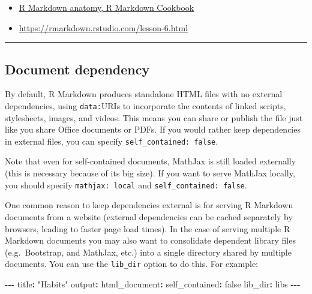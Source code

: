 \documentclass[
]{book}
\newenvironment{Shaded}{\begin{snugshade}}{\end{snugshade}}
\newcommand{\NormalTok}[1]{#1}
\newcommand{\SpecialCharTok}[1]{\textcolor[rgb]{0.81,0.36,0.00}{\textbf{#1}}}
\newcommand{\StringTok}[1]{\textcolor[rgb]{0.31,0.60,0.02}{#1}}
\providecommand{\tightlist}{%
  \setlength{\itemsep}{0pt}\setlength{\parskip}{0pt}}
\theoremstyle{definition}
\theoremstyle{definition}
\theoremstyle{definition}
\theoremstyle{definition}
\theoremstyle{remark}
\begin{document}
\begin{itemize}
\tightlist
\item
  \href{https://bookdown.org/yihui/rmarkdown-cookbook/rmarkdown-anatomy.html\#:~:text=In\%20short\%2C\%20we\%20can\%20include\%20variables\%20and\%20R\%20expressions\%20in\%20this\%20header\%20that\%20can\%20be\%20referenced\%20throughout\%20our\%20R\%20Markdown\%20document.}{R Markdown anatomy, R Markdown Cookbook}
\item
  \url{https://rmarkdown.rstudio.com/lesson-6.html}
\end{itemize}

\begin{center}\rule{0.5\linewidth}{0.5pt}\end{center}

\subsection*{Document dependency}\label{document-dependency}

By default, R Markdown produces standalone HTML files with no external dependencies, using \texttt{data:}URIs to incorporate the contents of linked scripts, stylesheets, images, and videos. This means you can share or publish the file just like you share Office documents or PDFs. If you would rather keep dependencies in external files, you can specify \texttt{self\_contained:\ false}.

Note that even for self-contained documents, MathJax is still loaded externally (this is necessary because of its big size). If you want to serve MathJax locally, you should specify \texttt{mathjax:\ local} and \texttt{self\_contained:\ false}.

One common reason to keep dependencies external is for serving R Markdown documents from a website (external dependencies can be cached separately by browsers, leading to faster page load times). In the case of serving multiple R Markdown documents you may also want to consolidate dependent library files (e.g.~Bootstrap, and MathJax, etc.) into a single directory shared by multiple documents. You can use the \texttt{lib\_dir} option to do this. For example:

\begin{Shaded}
\begin{Highlighting}[]
\SpecialCharTok{{-}{-}{-}}
\NormalTok{title}\SpecialCharTok{:} \StringTok{"Habits"}
\NormalTok{output}\SpecialCharTok{:}
\NormalTok{  html\_document}\SpecialCharTok{:}
\NormalTok{    self\_contained}\SpecialCharTok{:}\NormalTok{ false}
\NormalTok{    lib\_dir}\SpecialCharTok{:}\NormalTok{ libs}
\SpecialCharTok{{-}{-}{-}}
\end{Highlighting}
\end{Shaded}
\end{document}
